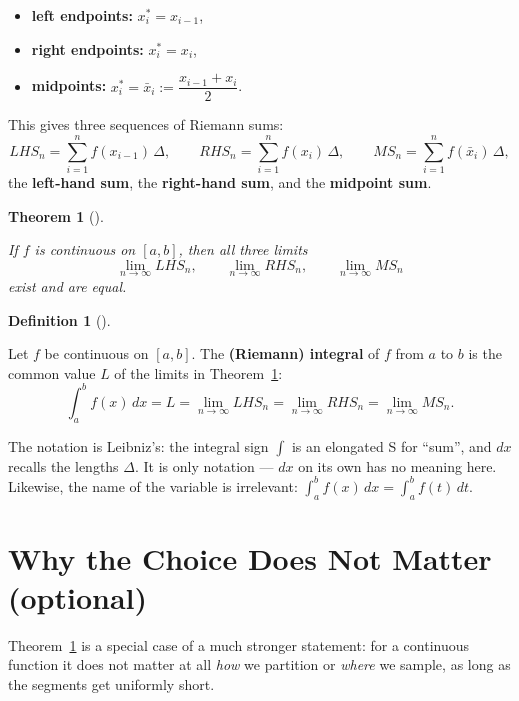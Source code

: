 \documentclass[
  letterpaper,
  DIV=11,
  numbers=noendperiod]{scrreprt}
\providecommand{\tightlist}{%
  \setlength{\itemsep}{0pt}\setlength{\parskip}{0pt}}
\theoremstyle{plain}
\theoremstyle{plain}
\theoremstyle{definition}
\newtheorem{definition}{Definition}[chapter]
\theoremstyle{definition}
\theoremstyle{definition}
\theoremstyle{plain}
\newtheorem{theorem}{Theorem}[chapter]
\theoremstyle{plain}
\theoremstyle{remark}
\begin{document}
\begin{itemize}
\tightlist
\item
  \textbf{left endpoints:} \(x_i^* = x_{i-1}\),
\item
  \textbf{right endpoints:} \(x_i^* = x_i\),
\item
  \textbf{midpoints:} \(x_i^* = \bar x_i := \dfrac{x_{i-1}+x_i}{2}\).
\end{itemize}

This gives three sequences of Riemann sums: \[
LHS_n = \sum_{i=1}^n f(x_{i-1})\,\Delta, \qquad
RHS_n = \sum_{i=1}^n f(x_i)\,\Delta, \qquad
MS_n = \sum_{i=1}^n f(\bar x_i)\,\Delta,
\] the \textbf{left-hand sum}, the \textbf{right-hand sum}, and the
\textbf{midpoint sum}.

\begin{theorem}[]\protect\hypertarget{thm-riemann-equipartition}{}\label{thm-riemann-equipartition}

\hfill\break
If \(f\) is continuous on \([a,b]\), then all three limits \[
\lim_{n\to\infty} LHS_n, \qquad \lim_{n\to\infty} RHS_n, \qquad \lim_{n\to\infty} MS_n
\] exist and are equal.

\end{theorem}

\begin{definition}[]\protect\hypertarget{def-riemann-integral}{}\label{def-riemann-integral}

\hfill\break
Let \(f\) be continuous on \([a,b]\). The \textbf{(Riemann) integral} of
\(f\) from \(a\) to \(b\) is the common value \(L\) of the limits in
Theorem~\ref{thm-riemann-equipartition}: \[
\int_a^b f(x)\,dx = L = \lim_{n\to\infty} LHS_n = \lim_{n\to\infty} RHS_n = \lim_{n\to\infty} MS_n.
\]

\end{definition}

The notation is Leibniz's: the integral sign \(\int\) is an elongated S
for ``sum'', and \(dx\) recalls the lengths \(\Delta\). It is only
notation --- \(dx\) on its own has no meaning here. Likewise, the name
of the variable is irrelevant:
\(\int_a^b f(x)\,dx = \int_a^b f(t)\,dt\).

\section{Why the Choice Does Not Matter
(optional)}\label{sec-choice-does-not-matter}

Theorem~\ref{thm-riemann-equipartition} is a special case of a much
stronger statement: for a continuous function it does not matter at all
\emph{how} we partition or \emph{where} we sample, as long as the
segments get uniformly short.
\end{document}
